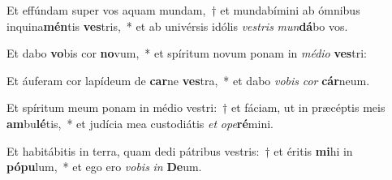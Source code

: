 \item Et effúndam super vos aquam mundam,~† et mundabímini ab ómnibus inquina\textbf{mén}tis \textbf{ves}tris,~* et ab univérsis idólis \textit{ves}\textit{tris} \textit{mun}\textbf{dá}bo vos.
\item Et dabo \textbf{vo}bis cor \textbf{no}vum,~* et spíritum novum ponam in \textit{mé}\textit{di}\textit{o} \textbf{ves}tri:
\item Et áuferam cor lapídeum de \textbf{car}ne \textbf{ves}tra,~* et dabo \textit{vo}\textit{bis} \textit{cor} \textbf{cár}neum.
\item Et spíritum meum ponam in médio vestri:~† et fáciam, ut in præcéptis meis \textbf{am}bu\textbf{lé}tis,~* et judícia mea custodiátis \textit{et} \textit{o}\textit{pe}\textbf{ré}mini.
\item Et habitábitis in terra, quam dedi pátribus vestris:~† et éritis \textbf{mi}hi in \textbf{pó}\textbf{pu}lum,~* et ego ero \textit{vo}\textit{bis} \textit{in} \textbf{De}um.
